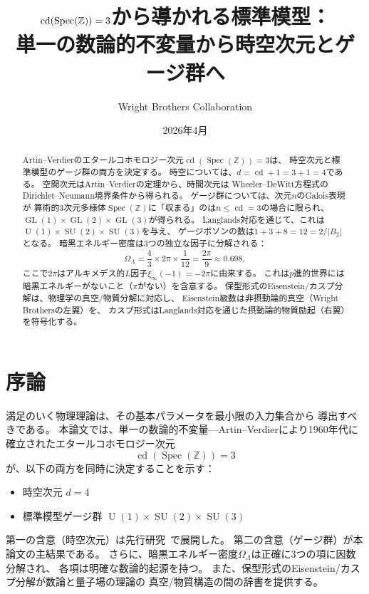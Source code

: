 \documentclass[12pt,a4paper]{article}
\title{\textbf{$\cd(\Spec(\Z))=3$から導かれる標準模型：\\
単一の数論的不変量から時空次元とゲージ群へ}}
\author{Wright Brothers Collaboration}
\date{2026年4月}
\theoremstyle{definition}
\newcommand{\Spec}{\operatorname{Spec}}
\newcommand{\GL}{\operatorname{GL}}
\newcommand{\SU}{\operatorname{SU}}
\newcommand{\cd}{\operatorname{cd}}
\newcommand{\Z}{\mathbb{Z}}
\newcommand{\OmL}{\Omega_\Lambda}
\newcommand{\U}{\operatorname{U}}
\begin{document}
\maketitle

\begin{abstract}
Artin--Verdierのエタールコホモロジー次元$\cd(\Spec(\Z))=3$は、
時空次元と標準模型のゲージ群の両方を決定する。
時空については、$d = \cd + 1 = 3+1 = 4$である。
空間次元はArtin--Verdierの定理から、時間次元は
Wheeler--DeWitt方程式のDirichlet--Neumann境界条件から得られる。
ゲージ群については、次元$n$のGalois表現が
算術的3次元多様体$\Spec(\Z)$に「収まる」のは$n \le \cd = 3$の場合に限られ、
$\GL(1)\times\GL(2)\times\GL(3)$が得られる。
Langlands対応を通じて、これは$\U(1)\times\SU(2)\times\SU(3)$を与え、
ゲージボソンの数は$1+3+8 = 12 = 2/|B_2|$となる。
暗黒エネルギー密度は3つの独立な因子に分解される：
\[
  \OmL = \frac{4}{3}\times 2\pi \times \frac{1}{12}
       = \frac{2\pi}{9} \approx 0.698,
\]
ここで$2\pi$はアルキメデス的$L$因子$\xi_\infty(-1)=-2\pi$に由来する。
これは$p$進的世界には暗黒エネルギーがないこと（$\pi$がない）を含意する。
保型形式のEisenstein/カスプ分解は、物理学の真空/物質分解に対応し、
Eisenstein級数は非摂動論的真空（Wright Brothersの左翼）を、
カスプ形式はLanglands対応を通じた摂動論的物質励起（右翼）を符号化する。
\end{abstract}

\tableofcontents

\section{序論}\label{sec:intro}

満足のいく物理理論は、その基本パラメータを最小限の入力集合から
導出すべきである。
本論文では、単一の数論的不変量---Artin--Verdierにより1960年代に
確立されたエタールコホモロジー次元~\cite{ArtinVerdier}
\begin{equation}\label{eq:cd3}
  \cd(\Spec(\Z)) = 3
\end{equation}
が、以下の両方を同時に決定することを示す：
\begin{itemize}
  \item 時空次元 $d=4$
  \item 標準模型ゲージ群 $\U(1)\times\SU(2)\times\SU(3)$
\end{itemize}

第一の含意（時空次元）は先行研究~\cite{WB_spacetime}で展開した。
第二の含意（ゲージ群）が本論文の主結果である。
さらに、暗黒エネルギー密度$\OmL$は正確に3つの項に因数分解され、
各項は明確な数論的起源を持つ。
また、保型形式のEisenstein/カスプ分解が数論と量子場の理論の
真空/物質構造の間の辞書を提供する。
\end{document}
